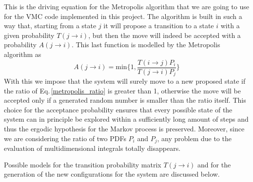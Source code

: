 This is the driving equation for the Metropolis algorithm that we are going to use for the VMC code implemented in this project. The algorithm is built in such a way that, starting from a state $j$ it will propose a transition to a state $i$ with a given probability $T(j\rightarrow i)$, but then the move will indeed be accepted with a probability $A(j\rightarrow i)$. This last function is modelled by the Metropolis algorithm as
\begin{equation*}
    A(j\rightarrow i ) = \text{min} \bigg\{ 1, \frac{T(i \rightarrow j) P_i}{T(j\rightarrow i) P_j} \bigg\}
\end{equation*}
With this we impose that the system will surely move to a new proposed state if the ratio of Eq.\,\ref{metropolis_ratio} is greater than 1, otherwise the move will be accepted only if a generated random number is smaller than the ratio itself. This choice for the acceptance probability ensures that every possible state of the system can in principle be explored within a sufficiently long amount of steps and thus the ergodic hypothesis for the Markov process is preserved. Moreover, since we are considering the ratio of two PDFs $P_i$ and $P_j$, any problem due to the evaluation of multidimensional integrals totally disappears. 

Possible models for the transition probability matrix $T(j\rightarrow i)$ and for the generation of the new configurations for the system are discussed below.

